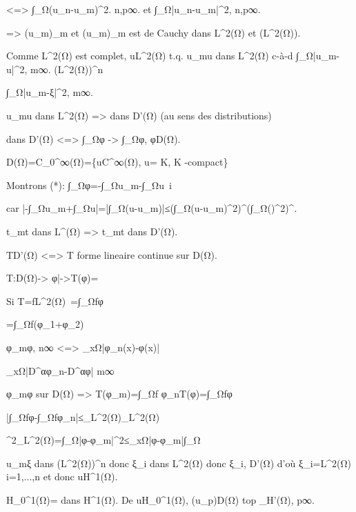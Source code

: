 <=> ∫_Ω(u_n-u_m)^2. n,p\to ∞. et ∫_Ω|\nabla u_n-\nabla u_m|^2, n,p\to ∞.

=> (u_m)_m et (\nabla u_m)_m est de Cauchy dans L^2(Ω) et (L^2(Ω)).

Comme L^2(Ω) est complet, \exists u\in L^2(Ω) t.q. u_m\to u dans L^2(Ω) c-à-d ∫_Ω|u_m-u|^2, m\to ∞. \in (L^2(Ω))^n

∫_Ω|\nabla u_m-ξ|^2, m\to ∞.

u_m\to u dans L^2(Ω) => \to{} dans D'(Ω) (au sens des distributions)

\fto {} dans D'(Ω) <=> ∫_Ωφ -> ∫_Ωφ, \forall φ\in D(Ω).

D(Ω)=C_0^∞(Ω)=\{u\in C^∞(Ω), \supp u= K, K -compact\}

Montrons (*):
∫_Ωφ=-∫_Ωu_m\to-∫_Ωu\ \forall i

car |-∫_Ωu_m+∫_Ωu|=|∫_Ω(u-u_m)|≤(∫_Ω(u-u_m)^2)^{}(∫_Ω()^2)^{}.

\begin{remark}
	t_m\to t dans L^(Ω) => t_m\fto t dans D'(Ω).
	
	T\in D'(Ω) <=> T forme lineaire continue sur D(Ω).
	
	T:D(Ω)->\R
	φ|->T(φ)=
		
	Si T=f\in L^2(Ω)\ =∫_Ωfφ
	
	=∫_Ωf(φ_1+φ_2)
	
	φ_m\to φ, n\to ∞ <=> \sup_{x\in Ω}|φ_n(x)-φ(x)| 
	
	\sup_{x\in Ω}|D^αφ_n-D^αφ|
	m\to∞
	
	φ_m\to φ sur D(Ω) => T(φ_m)=∫_Ωf φ_n\to T(φ)=∫_Ωfφ
	
	|∫_Ωfφ-∫_Ωfφ_n|≤_{L^2(Ω)}_{L^2(Ω)}
	
	^2_{L^2(Ω)}=∫_Ω|φ-φ_m|^2≤\sup_{x\in Ω}|φ-φ_m|∫_Ω
	
	\nabla u_m\to ξ dans (L^2(Ω))^n donc \to ξ_i dans L^2(Ω) donc  \fto ξ_i, D'(Ω) d'où ξ_i=\in L^2(Ω) \forall i=1,...,n et donc u\in H^1(Ω).
	
\end{remark}

\begin{definition}
	H_0^1(Ω)= dans H^1(Ω). De u\in H_0^1(Ω), \exists(u_p)\in D(Ω) top _{H'(Ω)}, p\to∞.
\end{definition}

